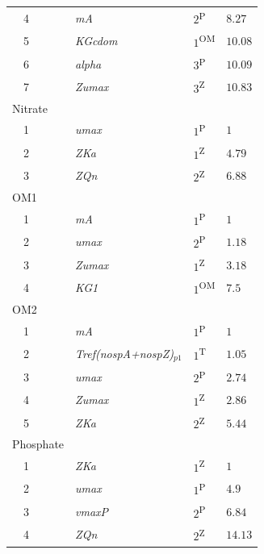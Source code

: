 \documentclass[letterpaper,12pt,oneside]{article}\usepackage[]{graphicx}\usepackage[]{color}
\begin{document}
\begin{table}[!tbp]
{\begin{center}
\begin{tabular}{llll}
~~4&\footnotesize{\textit{mA}}&$2$\textsuperscript{P}&$8.27$\tabularnewline
~~5&\footnotesize{\textit{KGcdom}}&$1$\textsuperscript{OM}&$10.08$\tabularnewline
~~6&\footnotesize{\textit{alpha}}&$3$\textsuperscript{P}&$10.09$\tabularnewline
~~7&\footnotesize{\textit{Zumax}}&$3$\textsuperscript{Z}&$10.83$\tabularnewline
\hline
{Nitrate}&&&\tabularnewline
~~1&\footnotesize{\textit{umax}}&$1$\textsuperscript{P}&$1$\tabularnewline
~~2&\footnotesize{\textit{ZKa}}&$1$\textsuperscript{Z}&$4.79$\tabularnewline
~~3&\footnotesize{\textit{ZQn}}&$2$\textsuperscript{Z}&$6.88$\tabularnewline
\hline
{OM1}&&&\tabularnewline
~~1&\footnotesize{\textit{mA}}&$1$\textsuperscript{P}&$1$\tabularnewline
~~2&\footnotesize{\textit{umax}}&$2$\textsuperscript{P}&$1.18$\tabularnewline
~~3&\footnotesize{\textit{Zumax}}&$1$\textsuperscript{Z}&$3.18$\tabularnewline
~~4&\footnotesize{\textit{KG1}}&$1$\textsuperscript{OM}&$7.5$\tabularnewline
\hline
{OM2}&&&\tabularnewline
~~1&\footnotesize{\textit{mA}}&$1$\textsuperscript{P}&$1$\tabularnewline
~~2&\footnotesize{\textit{Tref(nospA+nospZ)$_{p1}$}}&$1$\textsuperscript{T}&$1.05$\tabularnewline
~~3&\footnotesize{\textit{umax}}&$2$\textsuperscript{P}&$2.74$\tabularnewline
~~4&\footnotesize{\textit{Zumax}}&$1$\textsuperscript{Z}&$2.86$\tabularnewline
~~5&\footnotesize{\textit{ZKa}}&$2$\textsuperscript{Z}&$5.44$\tabularnewline
\hline
{Phosphate}&&&\tabularnewline
~~1&\footnotesize{\textit{ZKa}}&$1$\textsuperscript{Z}&$1$\tabularnewline
~~2&\footnotesize{\textit{umax}}&$1$\textsuperscript{P}&$4.9$\tabularnewline
~~3&\footnotesize{\textit{vmaxP}}&$2$\textsuperscript{P}&$6.84$\tabularnewline
~~4&\footnotesize{\textit{ZQn}}&$2$\textsuperscript{Z}&$14.13$\tabularnewline
\hline
\end{tabular}\end{center}}

\end{table}
\end{document}
